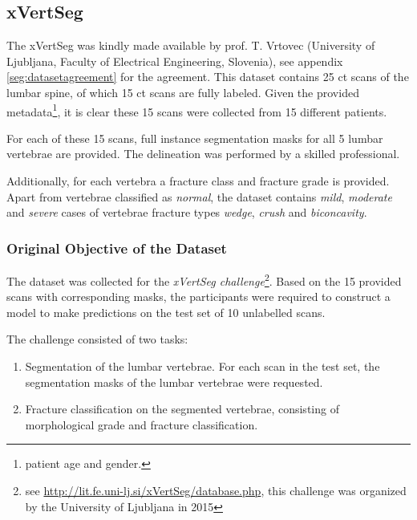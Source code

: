 \subsection{xVertSeg\label{sec:xVertSeg}}



The xVertSeg \cite{Ibragimov2014, Korez2015} was kindly made available by prof. T. Vrtovec (University of Ljubljana, Faculty of Electrical Engineering, Slovenia), see appendix \ref{seg:datasetagreement} for the agreement.
This dataset contains 25 \acrfull{ct} scans of the lumbar spine, of which 15 \acrshort{ct} scans are fully labeled.
Given the provided metadata\footnote{patient age and gender.}, it is clear these 15 scans were collected from 15 different patients.

For each of these 15 scans, full instance segmentation masks for all 5 lumbar vertebrae are provided. The delineation was performed by a skilled professional.

Additionally, for each vertebra a fracture class and fracture grade is provided. 
Apart from vertebrae classified as \textit{normal}, the dataset contains \textit{mild}, \textit{moderate} and \textit{severe} cases of vertebrae fracture types \textit{wedge}, \textit{crush} and \textit{biconcavity}.

\subsubsection{Original Objective of the Dataset}

The dataset was collected for the \textit{xVertSeg challenge}\footnote{see \url{http://lit.fe.uni-lj.si/xVertSeg/database.php}, this challenge was organized by the University of Ljubljana in 2015}.
Based on the 15 provided scans with corresponding masks, the participants were required to construct a model to make predictions on the test set of 10 unlabelled scans.

The challenge consisted of two tasks:
\begin{enumerate}
    \item Segmentation of the lumbar vertebrae. For each scan in the test set, the segmentation masks of the lumbar vertebrae were requested.
    \item Fracture classification on the segmented vertebrae, consisting of morphological grade and fracture classification.
\end{enumerate}

